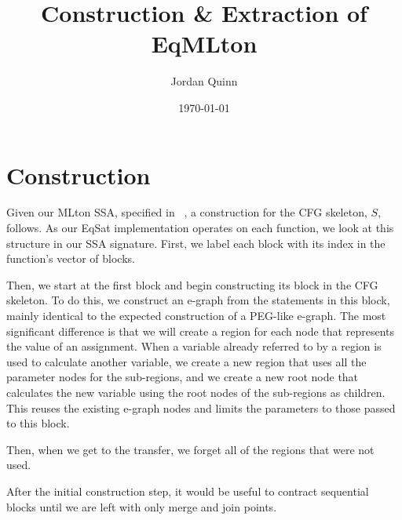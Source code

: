 \documentclass{article}
\title{Construction \& Extraction of EqMLton}
\author{Jordan Quinn}
\date{\today}
\begin{document}
\maketitle


\section{Construction}

Given our MLton SSA, specified in ~\cite{MLtonSSA}, a construction for the CFG skeleton, $S$, follows. As our EqSat implementation operates on each function, we look at this structure in our SSA signature. First, we label each block with its index in the function's vector of blocks.

Then, we start at the first block and begin constructing its block in the CFG skeleton. To do this, we construct an e-graph from the statements in this block, mainly identical to the expected construction of a PEG-like e-graph. The most significant difference is that we will create a region for each node that represents the value of an assignment. When a variable already referred to by a region is used to calculate another variable, we create a new region that uses all the parameter nodes for the sub-regions, and we create a new root node that calculates the new variable using the root nodes of the sub-regions as children. This reuses the existing e-graph nodes and limits the parameters to those passed to this block.

Then, when we get to the transfer, we forget all of the regions that were not used.

After the initial construction step, it would be useful to contract sequential blocks until we are left with only merge and join points.
\end{document}
